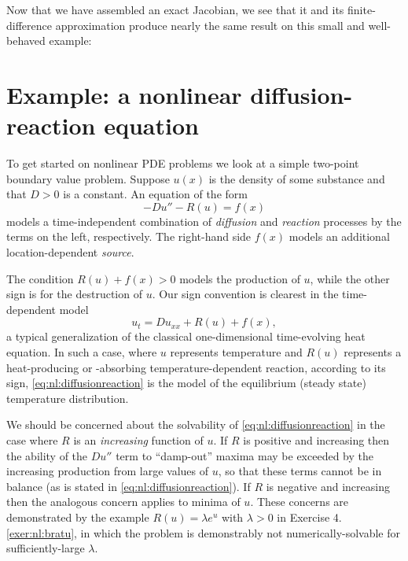 Now that we have assembled an exact Jacobian, we see that it and its finite-difference approximation produce nearly the same result on this small and well-behaved example:


\section{Example: a nonlinear diffusion-reaction equation}

To get started on nonlinear PDE problems we look at a simple two-point boundary value problem.  Suppose $u(x)$ is the density of some substance and that $D>0$ is a constant.  An equation of the form
\begin{equation}
- D u'' - R(u) = f(x)  \label{eq:nl:diffusionreaction}
\end{equation}
models a time-independent combination of \emph{diffusion} and \emph{reaction} processes by the terms on the left, respectively.  The right-hand side $f(x)$ models an additional location-dependent \emph{source}.

The condition $R(u)+f(x)>0$ models the production of $u$, while the other sign is for the destruction of $u$.  Our sign convention is clearest in the time-dependent model
\begin{equation}
u_t = D u_{xx} + R(u) + f(x),  \label{eq:nl:drtimedependent}
\end{equation}
a typical generalization of the classical one-dimensional time-evolving heat equation.  In such a case, where $u$ represents temperature and $R(u)$ represents a heat-producing or -absorbing temperature-dependent reaction, according to its sign, \eqref{eq:nl:diffusionreaction} is the model of the equilibrium (steady state) temperature distribution.

We should be concerned about the solvability of \eqref{eq:nl:diffusionreaction} in the case where $R$ is an \emph{increasing} function of $u$.  If $R$ is positive and increasing then the ability of the $D u''$ term to ``damp-out'' maxima may be exceeded by the increasing production from large values of $u$, so that these terms cannot be in balance (as is stated in \eqref{eq:nl:diffusionreaction}).  If $R$ is negative and increasing then the analogous concern applies to minima of $u$.  These concerns are demonstrated by the example $R(u) = \lambda e^u$ with $\lambda>0$ in Exercise 4.\ref{exer:nl:bratu}, in which the problem is demonstrably not numerically-solvable for sufficiently-large $\lambda$.  

